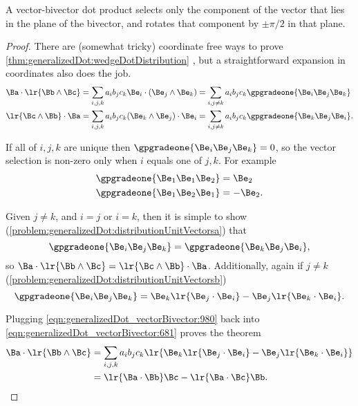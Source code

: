 A vector-bivector dot product selects only the component of the vector that lies in the plane of the bivector, and rotates that component by \( \pm \pi/2 \) in that plane.
\begin{proof}
There are (somewhat tricky) coordinate free ways to prove
\cref{thm:generalizedDot:wedgeDotDistribution}
, but a straightforward expansion in coordinates also does the job.
\begin{equation}\label{eqn:generalizedDot_vectorBivector:681}
\begin{aligned}
\Ba \cdot \lr{ \Bb \wedge \Bc } &= \sum_{i, j, k} a_i b_j c_k \Be_i \cdot (\Be_j \wedge \Be_k)
= \sum_{i, j \ne k} a_i b_j c_k \gpgradeone{ \Be_i \Be_j \Be_k }
\\
\lr{ \Bc \wedge \Bb } \cdot \Ba &= \sum_{i, j, k} a_i b_j c_k (\Be_k \wedge \Be_j) \cdot \Be_i
= \sum_{i, j \ne k} a_i b_j c_k \gpgradeone{ \Be_k \Be_j \Be_i }.
\end{aligned}
\end{equation}

If all of \( i, j, k \) are unique then \( \gpgradeone{ \Be_i \Be_j \Be_k } = 0 \), so the vector selection is non-zero only when \( i \) equals one of \( j, k \).
For example
\begin{equation}\label{eqn:generalizedDot_vectorBivector:1040}
\begin{aligned}
\gpgradeone{ \Be_1 \Be_1 \Be_2 } &= \Be_2 \\
\gpgradeone{ \Be_1 \Be_2 \Be_1 } &= -\Be_2.
\end{aligned}
\end{equation}

Given \( j \ne k \), and \( i = j \) or \( i = k \),  then it is simple to show
(\cref{problem:generalizedDot:distributionUnitVectorsa})
that
\begin{equation}\label{eqn:generalizedDot_vectorBivector:1020}
\gpgradeone{ \Be_i \Be_j \Be_k }
= \gpgradeone{ \Be_k \Be_j \Be_i },
\end{equation}
so \( \Ba \cdot \lr{ \Bb \wedge \Bc } = \lr{ \Bc \wedge \Bb } \cdot \Ba \).
Additionally, again if \( j \ne k \)
(\cref{problem:generalizedDot:distributionUnitVectorsb})
\begin{equation}\label{eqn:generalizedDot_vectorBivector:980}
\gpgradeone{ \Be_i \Be_j \Be_k }
=
\Be_k \lr{ \Be_j \cdot \Be_i }
-\Be_j \lr{ \Be_k \cdot \Be_i }.
\end{equation}

Plugging \cref{eqn:generalizedDot_vectorBivector:980} back into \cref{eqn:generalizedDot_vectorBivector:681} proves the theorem
\begin{equation}\label{eqn:generalizedDot_vectorBivector:1060}
\begin{aligned}
\Ba \cdot \lr{ \Bb \wedge \Bc }
&= \sum_{i, j, k} a_i b_j c_k \lr{ \Be_k \lr{ \Be_j \cdot \Be_i } -\Be_j \lr{ \Be_k \cdot \Be_i } } \\
&= \lr{ \Ba \cdot \Bb } \Bc - \lr{ \Ba \cdot \Bc } \Bb.
\end{aligned}
\end{equation}
\end{proof}


